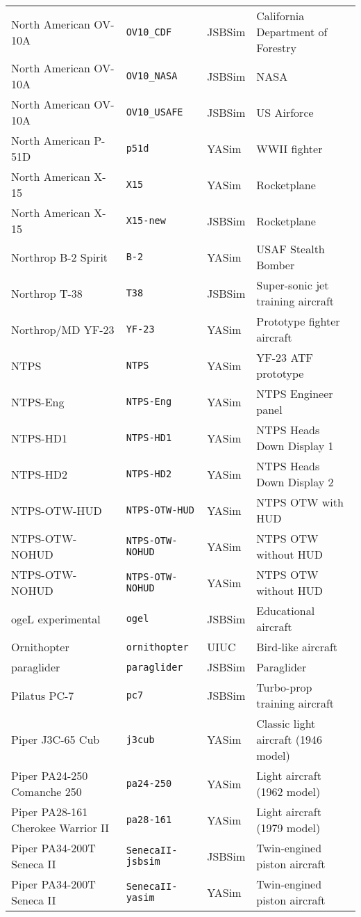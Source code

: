 \begin{tabular}{l|l|l|l}
   North American OV-10A & \texttt{OV10\_CDF} & JSBSim & California Department of Forestry\\
   North American OV-10A & \texttt{OV10\_NASA} & JSBSim & NASA\\
   North American OV-10A & \texttt{OV10\_USAFE} & JSBSim & US Airforce\\
   North American P-51D & \texttt{p51d} & YASim & WWII fighter\\
   North American X-15 & \texttt{X15} & YASim & Rocketplane\\
   North American X-15 & \texttt{X15-new} & JSBSim & Rocketplane\\
   Northrop B-2 Spirit & \texttt{B-2} & YASim & USAF Stealth Bomber\\
   Northrop T-38 & \texttt{T38} & JSBSim & Super-sonic jet training aircraft\\
   Northrop/MD YF-23 & \texttt{YF-23} & YASim & Prototype fighter aircraft\\
   NTPS             & \texttt{NTPS}  & YASim  &  YF-23 ATF prototype\\
   NTPS-Eng         & \texttt{NTPS-Eng}  & YASim  &  NTPS Engineer panel\\
   NTPS-HD1         & \texttt{NTPS-HD1}  & YASim  &  NTPS Heads Down Display 1\\
   NTPS-HD2         & \texttt{NTPS-HD2}  & YASim  &  NTPS Heads Down Display 2\\
   NTPS-OTW-HUD     & \texttt{NTPS-OTW-HUD}  & YASim  &  NTPS OTW with HUD\\
   NTPS-OTW-NOHUD   & \texttt{NTPS-OTW-NOHUD}  & YASim  &  NTPS OTW without HUD\\
   NTPS-OTW-NOHUD   & \texttt{NTPS-OTW-NOHUD}  & YASim  &  NTPS OTW without HUD\\
   ogeL experimental & \texttt{ogel} & JSBSim & Educational aircraft\\
   Ornithopter & \texttt{ornithopter} & UIUC & Bird-like aircraft\\
   paraglider & \texttt{paraglider} & JSBSim & Paraglider\\
   Pilatus PC-7 & \texttt{pc7} & JSBSim & Turbo-prop training aircraft\\
   Piper J3C-65 Cub & \texttt{j3cub} & YASim & Classic light aircraft (1946 model)\\
   Piper PA24-250 Comanche 250 & \texttt{pa24-250} & YASim & Light aircraft (1962 model)\\
   Piper PA28-161 Cherokee Warrior II & \texttt{pa28-161} & YASim & Light aircraft (1979 model)\\
   Piper PA34-200T Seneca II & \texttt{SenecaII-jsbsim} & JSBSim & Twin-engined piston aircraft\\
   Piper PA34-200T Seneca II & \texttt{SenecaII-yasim} & YASim & Twin-engined piston aircraft\\
\end{tabular}
